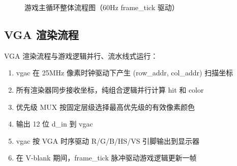 \documentclass[12pt,a4paper]{ctexart}
\begin{document}
\begin{figure}[H]
{%
}
\caption{游戏主循环整体流程图（60Hz frame\_tick 驱动）}
\label{fig:flow}
\end{figure}

\subsection{VGA 渲染流程}

VGA 渲染流程与游戏逻辑并行、流水线式运行：

\begin{enumerate}[label=(\arabic*)]
    \item vgac 在 25MHz 像素时钟驱动下产生 (row\_addr, col\_addr) 扫描坐标
    \item 所有渲染器同步接收坐标，纯组合逻辑并行计算 hit 和 color
    \item 优先级 MUX 按固定层级选择最高优先级的有效像素颜色
    \item 输出 12 位 d\_in 到 vgac
    \item vgac 按 VGA 时序驱动 R/G/B/HS/VS 引脚输出到显示器
    \item 在 V-blank 期间，frame\_tick 脉冲驱动游戏逻辑更新一帧
\end{enumerate}
\end{document}
